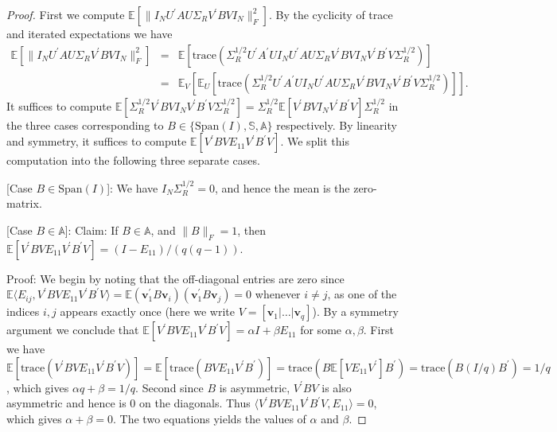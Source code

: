 \documentclass[11pt,letterpaper]{article}
\newcommand{\bv}{\mathbf{v}}
\begin{document}
\begin{proof}
	First we compute $\mathbb{E} [ \| I_N U^{\prime} A U \Sigma_R V^{\prime} B V I_N \|_F^2  ]$. By the cyclicity of trace and iterated expectations we have
	\begin{eqnarray*}
		\mathbb{E} [ \| I_N U^{\prime} A U \Sigma_R V^{\prime} B V I_N \|_F^2  ] & = & \mathbb{E}[ \mathrm{trace} ( \Sigma_R^{1/2} U^{\prime} A^{\prime} U I_N U^{\prime} A U \Sigma_R V^{\prime} B V I_N  V^{\prime} B^{\prime} V \Sigma_R^{1/2})  ] \\
		& = & \mathbb{E}_{V}[ \mathbb{E}_{U} [\mathrm{trace} ( \Sigma_R^{1/2} U^{\prime} A^{\prime} U I_N U^{\prime} A U \Sigma_R V^{\prime} B V I_N  V^{\prime} B^{\prime} V \Sigma_R^{1/2})]].
	\end{eqnarray*}
	It suffices to compute $\mathbb{E} [\Sigma_R^{1/2} V^{\prime} B V I_N  V^{\prime} B^{\prime} V \Sigma_R^{1/2}]=\Sigma_R^{1/2} \mathbb{E} [ V^{\prime} B V I_N  V^{\prime} B^{\prime} V] \Sigma_R^{1/2}$ in the three cases corresponding to $B \in \{ \mathrm{Span}(I), \mathbb{S}, \mathbb{A} \}$ respectively.  By linearity and symmetry, it suffices to compute $\mathbb{E} [V^{\prime} B V E_{11}  V^{\prime} B^{\prime} V]$.  We split this computation into the following three separate cases.
	
	[Case $B \in \mathrm{Span}(I)$]:
	We have $I_N \Sigma_R^{1/2} = 0$, and hence the mean is the zero-matrix.  
	
	[Case $B \in \mathbb{A}$]:	
	Claim: If $B \in \mathbb{A}$, and $\|B\|_F = 1$, then $\mathbb{E} [V^{\prime} B V E_{11}  V^{\prime} B^{\prime} V] = (I- E_{11})/(q(q-1))$.
	
	Proof: We begin by noting that the off-diagonal entries are zero since $\mathbb{E} \langle E_{ij}, V^{\prime} B V E_{11}  V^{\prime} B^{\prime} V\rangle = \mathbb{E} (\bv_1^{\prime} B \bv_i)(\bv_1^{\prime} B \bv_j) = 0$ whenever $i \neq j$, as one of the indices $i,j$ appears exactly once (here we write $V=[\bv_1 | \ldots | \bv_q]$). By a symmetry argument we conclude that $\mathbb{E} [V^{\prime} B V E_{11}  V^{\prime} B^{\prime} V]  = \alpha I + \beta E_{11}$ for some $\alpha,\beta$. First we have $\mathbb{E} [ \mathrm{trace}(V^{\prime} B V E_{11}  V^{\prime} B^{\prime} V )] = \mathbb{E} [ \mathrm{trace}(B V E_{11} V^{\prime} B^{\prime})] = \mathrm{trace}(B \mathbb{E} [ V E_{11} V^{\prime}] B^{\prime}) = \mathrm{trace}(B (I/q) B^{\prime}) = 1/q$, which gives $\alpha q + \beta = 1/q$. Second since $B$ is asymmetric, $V^{\prime} B V$ is also asymmetric and hence is $0$ on the diagonals. Thus $\langle V^{\prime} B V E_{11}  V^{\prime} B^{\prime} V, E_{11} \rangle = 0$, which gives $\alpha + \beta = 0$. The two equations yields the values of $\alpha$ and $\beta$.
	

\end{proof}
\end{document}
